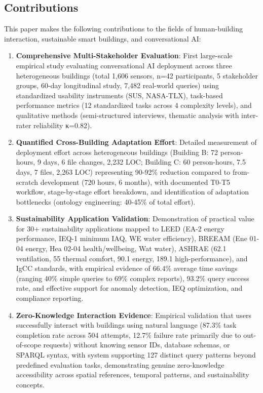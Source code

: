 \documentclass[acmlarge]{acmart}
\begin{document}
\subsection{Contributions}

This paper makes the following contributions to the fields of human-building interaction, sustainable smart buildings, and conversational AI:

\begin{enumerate}
    \item \textbf{Comprehensive Multi-Stakeholder Evaluation}: First large-scale empirical study evaluating conversational AI deployment across three heterogeneous buildings (total 1,606 sensors, n=42 participants, 5 stakeholder groups, 60-day longitudinal study, 7,482 real-world queries) using standardized usability instruments (SUS, NASA-TLX), task-based performance metrics (12 standardized tasks across 4 complexity levels), and qualitative methods (semi-structured interviews, thematic analysis with inter-rater reliability κ=0.82).
    
    \item \textbf{Quantified Cross-Building Adaptation Effort}: Detailed measurement of deployment effort across heterogeneous buildings (Building B: 72 person-hours, 9 days, 6 file changes, 2,232 LOC; Building C: 60 person-hours, 7.5 days, 7 files, 2,263 LOC) representing 90-92\% reduction compared to from-scratch development (720 hours, 6 months), with documented T0-T5 workflow, stage-by-stage effort breakdown, and identification of adaptation bottlenecks (ontology engineering: 40-45\% of total effort).
    
    \item \textbf{Sustainability Application Validation}: Demonstration of practical value for 30+ sustainability applications mapped to LEED (EA-2 energy performance, IEQ-1 minimum IAQ, WE water efficiency), BREEAM (Ene 01-04 energy, Hea 02-04 health/wellbeing, Wat water), ASHRAE (62.1 ventilation, 55 thermal comfort, 90.1 energy, 189.1 high-performance), and IgCC standards, with empirical evidence of 66.4\% average time savings (ranging 40\% simple queries to 69\% complex reports), 93.2\% query success rate, and effective support for anomaly detection, IEQ optimization, and compliance reporting.
    
    \item \textbf{Zero-Knowledge Interaction Evidence}: Empirical validation that users successfully interact with buildings using natural language (87.3\% task completion rate across 504 attempts, 12.7\% failure rate primarily due to out-of-scope requests) without knowing sensor IDs, database schemas, or SPARQL syntax, with system supporting 127 distinct query patterns beyond predefined evaluation tasks, demonstrating genuine zero-knowledge accessibility across spatial references, temporal patterns, and sustainability concepts.
    

\end{enumerate}
\end{document}
